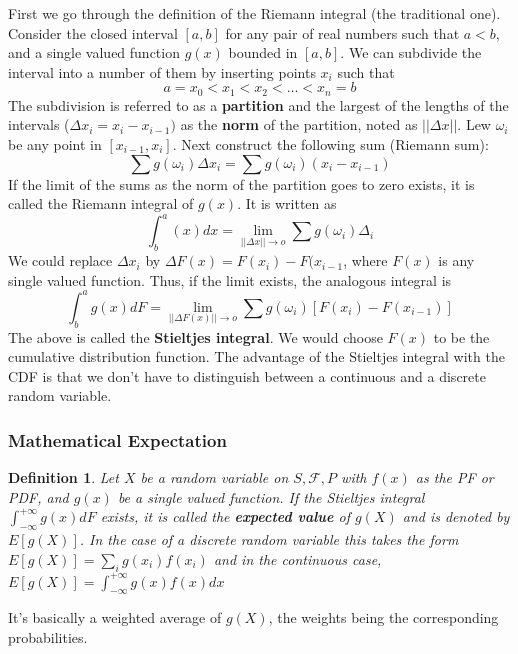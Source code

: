 \documentclass{article}
\newtheorem{definition}{Definition}[section]
\begin{document}
First we go through the definition of the Riemann integral (the traditional one). Consider the closed interval \([a,b]\) for any pair of real numbers such that \(a<b\), and a single valued function \(g(x)\) bounded in \([a,b]\). We can subdivide the interval into a number of them by inserting points \(x_i\) such that
\begin{equation*}
    a = x_0 < x_1 < x_2 < \dots < x_n = b
\end{equation*}
The subdivision is referred to as a \textbf{partition} and the largest of the lengths of the intervals (\(\Delta x_i = x_i - x_{i-1})\) as the \textbf{norm} of the partition, noted as \(||\Delta x||\). Lew \(\omega_i\) be any point in \([x_{i-1},x_i]\). Next construct the following sum (Riemann sum):
\begin{equation*}
    \sum g(\omega_i) \Delta x_i = \sum g(\omega_i) (x_i - x_{i-1})
\end{equation*}
If the limit of the sums as the norm of the partition goes to zero exists, it is called the Riemann integral of \(g(x)\). It is written as
\begin{equation*}
    \int_{b}^{a} (x)dx= \lim\limits_{||\Delta x|| \rightarrow o} \sum g (\omega_i) \Delta_i
\end{equation*}
We could replace \(\Delta x_i\) by \(\Delta F(x) = F (x_i) - F(x_{i-1}\), where \(F(x)\) is any single valued function. Thus, if the limit exists, the analogous integral is
\begin{equation*}
    \int_{b}^{a} g(x)dF= \lim\limits_{||\Delta F(x)|| \rightarrow o} \sum g (\omega_i) [F(x_i)-F(x_{i-1})]
\end{equation*}
The above is called the \textbf{Stieltjes integral}. We would choose \(F(x)\) to be the cumulative distribution function. The advantage of the Stieltjes integral with the CDF is that we don't have to distinguish between a continuous and a discrete random variable.

\subsubsection{Mathematical Expectation}

\begin{definition}
    Let \(X\) be a random variable on \(S, \mathcal{F}, P\) with \(f(x)\) as the PF or PDF, and \(g(x)\) be a single valued function. If the Stieltjes integral \(\int_{-\infty}^{+\infty} g(x) dF\) exists, it is called the \textbf{expected value} of \(g(X)\) and is denoted by \(E[g(X)]\). In the case of a discrete random variable this takes the form \(E[g(X)] = \sum_i g(x_i)f(x_i)\) and in the continuous case, \(E[g(X)]= \int_{-\infty}^{+\infty} g(x) f(x) dx \)
\end{definition}
It's basically a weighted average of \(g(X)\), the weights being the corresponding probabilities.
\end{document}
